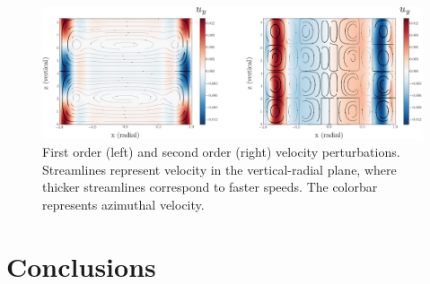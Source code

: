 \documentclass{emulateapj}
\begin{document}
\begin{figure}[h!]
\centering
\includegraphics[scale=0.5]{twoorders_velocity.eps}
\caption{First order (left) and second order (right) velocity perturbations. Streamlines represent velocity in the vertical-radial plane, where thicker streamlines correspond to faster speeds. The colorbar represents azimuthal velocity.}
\end{figure}

\section{Conclusions}
\end{document}
